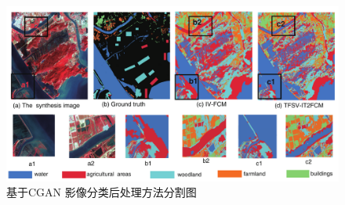 \begin{figure}[htbp]
    \centering
    \includegraphics[width=1.0\textwidth]{figures/hengqin}
    \caption{基于CGAN 影像分类后处理方法分割图 }\label{fig:hengqin}
\end{figure}



